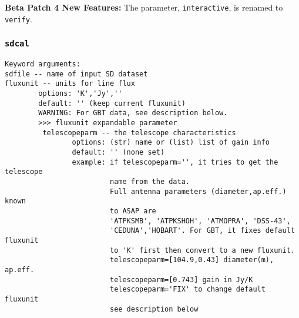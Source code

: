     {\bf Beta Patch 4 New Features:}
    The parameter, {\tt interactive}, is renamed to {\tt verify}.  
  
\subsubsection{{\tt sdcal}}
\label{section:sd.sdtasks.tasks.sdcal}

\begin{verbatim}
Keyword arguments:
sdfile -- name of input SD dataset
fluxunit -- units for line flux
        options: 'K','Jy',''
        default: '' (keep current fluxunit)
        WARNING: For GBT data, see description below.
        >>> fluxunit expandable parameter
         telescopeparm -- the telescope characteristics
                options: (str) name or (list) list of gain info
                default: '' (none set)
                example: if telescopeparm='', it tries to get the telescope
                         name from the data.
                         Full antenna parameters (diameter,ap.eff.) known
                         to ASAP are
                         'ATPKSMB', 'ATPKSHOH', 'ATMOPRA', 'DSS-43',
                         'CEDUNA','HOBART'. For GBT, it fixes default fluxunit
                         to 'K' first then convert to a new fluxunit.
                         telescopeparm=[104.9,0.43] diameter(m), ap.eff.
                         telescopeparm=[0.743] gain in Jy/K
                         telescopeparm='FIX' to change default fluxunit
                         see description below


\end{verbatim}
